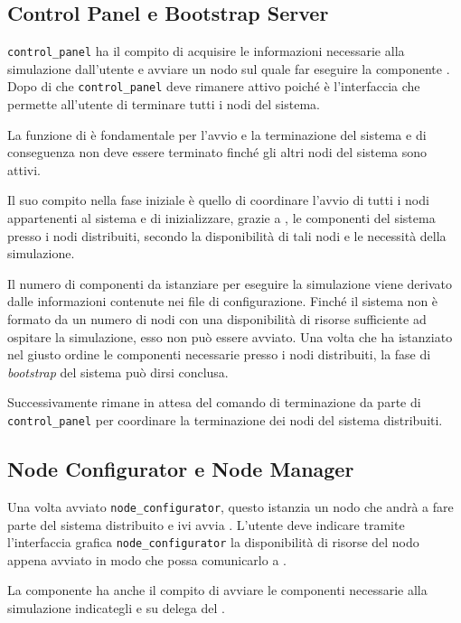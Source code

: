 \subsection*{Control Panel e Bootstrap Server}
\texttt{control\_panel} ha il compito di acquisire le informazioni necessarie alla simulazione dall'utente e avviare un nodo \Erlang{} sul quale far eseguire la componente \bootserv{}.
Dopo di che \texttt{control\_panel} deve rimanere attivo poiché è l'interfaccia che permette all'utente di terminare tutti i nodi del sistema.

La funzione di \bootserv{} è fondamentale per l'avvio e la terminazione del sistema e di conseguenza non deve essere terminato finché gli altri nodi del sistema sono attivi.

Il suo compito nella fase iniziale è quello di coordinare l'avvio di tutti i nodi appartenenti al sistema e di inizializzare, grazie a \nodeman{}, le componenti del sistema presso i nodi distribuiti, secondo la disponibilità di tali nodi e le necessità della simulazione.

Il numero di componenti da istanziare per eseguire la simulazione viene derivato dalle informazioni contenute nei file di configurazione. Finché il sistema non è formato da un numero di nodi con una disponibilità di risorse sufficiente ad ospitare la simulazione, esso non può essere avviato.
Una volta che \bootserv{} ha istanziato nel giusto ordine le componenti necessarie presso i nodi distribuiti, la fase di \textit{bootstrap} del sistema può dirsi conclusa.

Successivamente \bootserv{} rimane in attesa del comando di terminazione da parte di \texttt{control\_panel} per coordinare la terminazione dei nodi del sistema distribuiti.

\subsection*{Node Configurator e Node Manager}
Una volta avviato \texttt{node\_configurator}, questo istanzia un nodo \Erlang{} che andrà a fare parte del sistema distribuito e ivi avvia \nodeman{}. L'utente deve indicare tramite l'interfaccia grafica \texttt{node\_configurator} la disponibilità di risorse del nodo \Erlang{} appena avviato in modo che \nodeman{} possa comunicarlo a \bootserv{}.

La componente \nodeman{} ha anche il compito di avviare le componenti necessarie alla simulazione indicategli e su delega del \bootserv{}.

